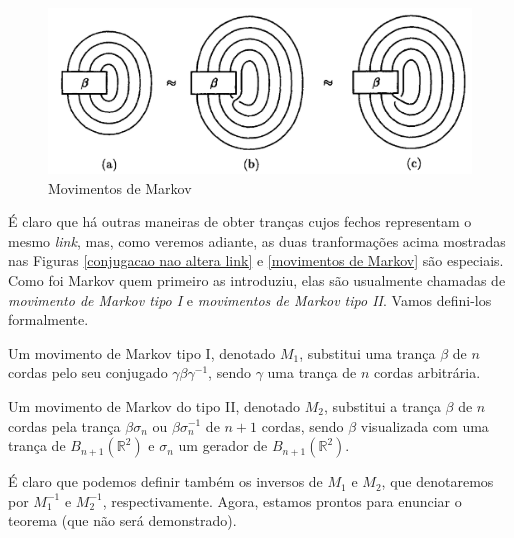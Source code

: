 	\begin{figure}[H]
		\begin{center}
			\includegraphics[width=13cm]{Images/movimentos_de_markov.png}
		\end{center}\caption{Movimentos de Markov}
		\label{movimentos de Markov}
	\end{figure}
	\par\vspace{0.3cm} É claro que há outras maneiras de obter tranças cujos fechos representam o mesmo \textit{link}, mas, como veremos adiante, as duas tranformações acima mostradas nas Figuras \eqref{conjugacao nao altera link} e \eqref{movimentos de Markov} são especiais. Como foi Markov quem primeiro as introduziu, elas são usualmente chamadas de \textit{movimento de Markov tipo I} e \textit{movimentos de Markov tipo II}. Vamos defini-los formalmente.
	\begin{deff}
		\label{def movimento de Markov tipo 1}
		Um movimento de Markov tipo I, denotado $M_1$, substitui uma trança $\beta$ de $n$ cordas pelo seu conjugado $\gamma\beta\gamma^{-1}$, sendo $\gamma$ uma trança de $n$ cordas arbitrária.  
	\end{deff}
	\begin{deff}
		\label{def movimento de Markov tipo 2}
		Um movimento de Markov do tipo II, denotado $M_2$, substitui a trança $\beta$ de $n$ cordas pela trança $\beta\sigma_n$ ou $\beta\sigma_n^{-1}$ de $n+1$ cordas, sendo $\beta$ visualizada com uma trança de $B_{n+1}(\mathbb{R}^2)$ e $\sigma_n$ um gerador de $B_{n+1}(\mathbb{R}^2)$. 
	\end{deff}
	\par\vspace{0.3cm} É claro que podemos definir também os inversos de $M_1$ e $M_2$, que denotaremos por $M_1^{-1}$ e $M_2^{-1}$, respectivamente. Agora, estamos prontos para enunciar o teorema (que não será demonstrado).
	
